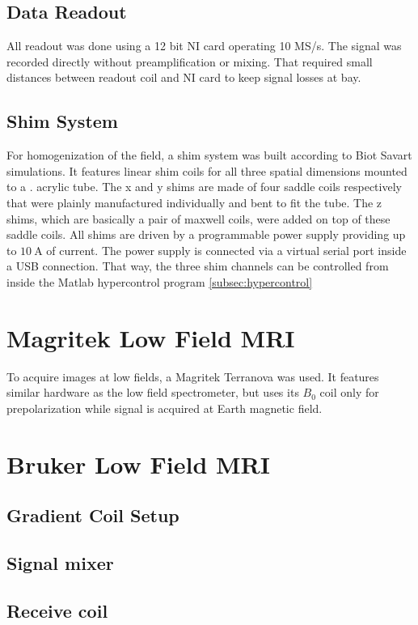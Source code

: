 		\subsection{Data Readout}
			All readout was done using a 12 bit NI  card operating 10 MS/s. The signal
			was recorded directly without preamplification or mixing. That required small distances
			between readout coil and NI card to keep signal losses at bay. 
		\subsection{Shim System}
			For homogenization of the field, a shim system was built according to Biot Savart
			simulations. It features linear shim coils for all three spatial dimensions mounted to a
			. acrylic tube. The x and y shims are made of four saddle coils respectively that
			were plainly manufactured individually and bent to fit the tube. The z shims, which are
			basically a pair of maxwell coils, were added on top of these saddle coils. All shims
			are driven by a  programmable power supply providing up to
			$\SI{10}{\ampere}$ of current. The power supply is connected via a virtual serial port inside
			a USB connection. That way, the three shim channels can be controlled from inside the
			Matlab hypercontrol program \ref{subsec:hypercontrol}
	\section{Magritek Low Field MRI}
		To acquire images at low fields, a Magritek Terranova  was used. It features
		similar hardware as the low field spectrometer, but uses its $B_0$ coil only for
		prepolarization while signal is acquired at Earth magnetic field.
	\section{Bruker Low Field MRI}
		\subsection{Gradient Coil Setup}
		\subsection{Signal mixer}
		\subsection{Receive coil}
